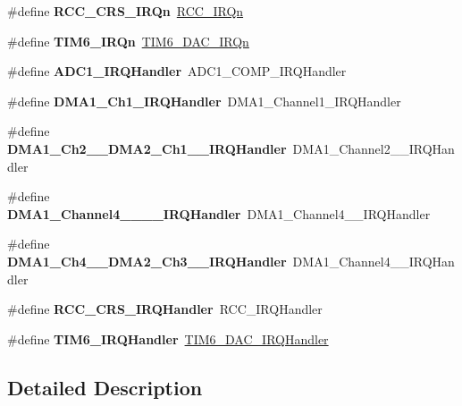 \begin{DoxyCompactItemize}
\#define {\bfseries R\+C\+C\+\_\+\+C\+R\+S\+\_\+\+I\+R\+Qn}~\hyperlink{group___peripheral__interrupt__number__definition_gga7e1129cd8a196f4284d41db3e82ad5c8a5710b22392997bac63daa5c999730f77}{R\+C\+C\+\_\+\+I\+R\+Qn}
\item 
\mbox{\label{group__stm32f058xx_ga16b30b9f4d374c506d31c9d4c6cce8a1}} 
\#define {\bfseries T\+I\+M6\+\_\+\+I\+R\+Qn}~\hyperlink{group___peripheral__interrupt__number__definition_gga7e1129cd8a196f4284d41db3e82ad5c8a5f581e9aedfaccd9b1db9ec793804b45}{T\+I\+M6\+\_\+\+D\+A\+C\+\_\+\+I\+R\+Qn}
\item 
\mbox{\label{group__stm32f058xx_gacfad9f182b248bceb2ebedd9ae366546}} 
\#define {\bfseries A\+D\+C1\+\_\+\+I\+R\+Q\+Handler}~A\+D\+C1\+\_\+\+C\+O\+M\+P\+\_\+\+I\+R\+Q\+Handler
\item 
\mbox{\label{group__stm32f058xx_ga3f7debe9fc2548ab6640825967110101}} 
\#define {\bfseries D\+M\+A1\+\_\+\+Ch1\+\_\+\+I\+R\+Q\+Handler}~D\+M\+A1\+\_\+\+Channel1\+\_\+\+I\+R\+Q\+Handler
\item 
\mbox{\label{group__stm32f058xx_ga3752ab0b9a6635ccd7bc87b99ee8fd9b}} 
\#define {\bfseries D\+M\+A1\+\_\+\+Ch2\+\_\+\_\+\+D\+M\+A2\+\_\+\+Ch1\+\_\+\_\+\+I\+R\+Q\+Handler}~D\+M\+A1\+\_\+\+Channel2\+\_\+\_\+\+I\+R\+Q\+Handler
\item 
\mbox{\label{group__stm32f058xx_gae3db46ad17e9f800e0f88b489eed522d}} 
\#define {\bfseries D\+M\+A1\+\_\+\+Channel4\+\_\+\_\+\_\+\_\+\+I\+R\+Q\+Handler}~D\+M\+A1\+\_\+\+Channel4\+\_\+\_\+\+I\+R\+Q\+Handler
\item 
\mbox{\label{group__stm32f058xx_ga035f9aa47c046222541cca70e281b415}} 
\#define {\bfseries D\+M\+A1\+\_\+\+Ch4\+\_\+\_\+\+D\+M\+A2\+\_\+\+Ch3\+\_\+\_\+\+I\+R\+Q\+Handler}~D\+M\+A1\+\_\+\+Channel4\+\_\+\_\+\+I\+R\+Q\+Handler
\item 
\mbox{\label{group__stm32f058xx_ga82a9eac30db2cc914975bc71ce5fcb92}} 
\#define {\bfseries R\+C\+C\+\_\+\+C\+R\+S\+\_\+\+I\+R\+Q\+Handler}~R\+C\+C\+\_\+\+I\+R\+Q\+Handler
\item 
\mbox{\label{group__stm32f058xx_gae30e35a563a952a284f3f54d7f164ccd}} 
\#define {\bfseries T\+I\+M6\+\_\+\+I\+R\+Q\+Handler}~\hyperlink{group___h_a_l___time_base___t_i_m_ga0839a45f331c4c067939b9c4533bbf4d}{T\+I\+M6\+\_\+\+D\+A\+C\+\_\+\+I\+R\+Q\+Handler}
\end{DoxyCompactItemize}


\subsection{Detailed Description}
